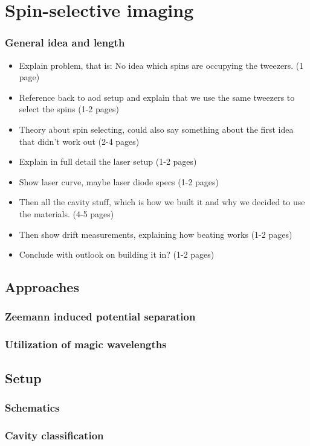 \chapter{Spin-selective imaging}
\subsection*{General idea and length}

\begin{itemize}
	\item Explain problem, that is: No idea which spins are occupying the tweezers. (1 page)
	\item Reference back to aod setup and explain that we use the same tweezers to select the spins (1-2 pages)
	\item Theory about spin selecting, could also say something about the first idea that didn't work out (2-4 pages)
	\item Explain in full detail the laser setup (1-2 pages)
	\item Show laser curve, maybe laser diode specs (1-2 pages)
	\item Then all the cavity stuff, which is how we built it and why we decided to use the materials. (4-5 pages)
	\item Then show drift measurements, explaining how beating works (1-2 pages)
	\item Conclude with outlook on building it in? (1-2 pages)
\end{itemize}

	\section{Approaches}
		\subsection{Zeemann induced potential separation}
		\subsection{Utilization of magic wavelengths}
	\section{Setup}
		\subsection{Schematics}
		\subsection{Cavity classification}

